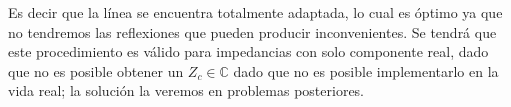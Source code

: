 \documentclass[
  11pt,
  letterpaper,
   addpoints,
   answers
  ]{exam}
\begin{document}
\begin{questions}
\begin{solution}
\begin{enumerate}
Es decir que la línea se encuentra totalmente adaptada, lo cual es óptimo ya que no tendremos las reflexiones que pueden producir inconvenientes. Se tendrá que este procedimiento es válido para impedancias con solo componente real, dado que no es posible obtener un $Z_{c} \in \mathbb{C}$ dado que no es posible implementarlo en la vida real; la solución la veremos en problemas posteriores.

         \end{enumerate}
    \end{solution}
     
    
\end{questions}
\newpage
\end{document}
